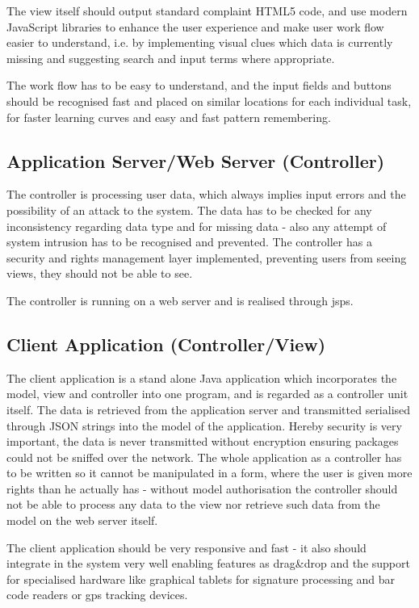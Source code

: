 \documentclass[11pt,a4paper,oneside,svgnames]{report}
\begin{document}
The view itself should output standard complaint HTML5 code, and use modern JavaScript libraries to enhance the user experience and make user work flow easier to understand, i.e. by implementing visual clues which data is currently missing and suggesting search and input terms where appropriate.

The work flow has to be easy to understand, and the input fields and buttons should be recognised fast and placed on similar locations for each individual task, for faster learning curves and easy and fast pattern remembering.

\subsection{Application Server/Web Server (Controller)}
The controller is processing user data, which always implies input errors and the possibility of an attack to the system. The data has to be checked for any inconsistency regarding data type and for missing data - also any attempt of system intrusion has to be recognised and prevented.
The controller has a security and rights management layer implemented, preventing users from seeing views, they should not be able to see.

The controller is running on a web server and is realised through \glspl{jsp}.

\subsection{Client Application (Controller/View)}
The client application is a stand alone Java application which incorporates the model, view and controller into one program, and is regarded as a controller unit itself. The data is retrieved from the application server and transmitted serialised through JSON strings into the model of the application. Hereby security is very important, the data is never transmitted without encryption ensuring packages could not be sniffed over the network. The whole application as a controller has to be written so it cannot be manipulated in a form, where the user is given more rights than he actually has - without model authorisation the controller should not be able to process any data to the view nor retrieve such data from the model on the web server itself.

The client application should be very responsive and fast - it also should integrate in the system very well enabling features as drag\&drop and the support for specialised hardware like graphical tablets for signature processing and bar code readers or gps tracking devices.
\end{document}
